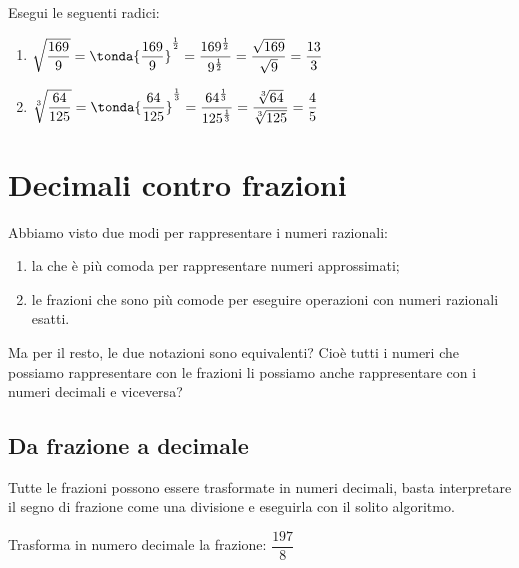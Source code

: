 \begin{esempio}{}{}
Esegui le seguenti radici:
\begin{enumerate} %
\item 
\(\sqrt{\dfrac{169}{9}} = \tonda{\dfrac{169}{9}}^{\frac{1}{2}} =
  \dfrac{169^{\frac{1}{2}}}{9^{\frac{1}{2}}} = 
  \dfrac{\sqrt{169}}{\sqrt{9}} = 
  \dfrac{13}{3}\)
\item 
\(\sqrt[3]{\dfrac{64}{125}} = \tonda{\dfrac{64}{125}}^{\frac{1}{3}} =
  \dfrac{64^{\frac{1}{3}}}{125^{\frac{1}{3}}} = 
  \dfrac{\sqrt[3]{64}}{\sqrt[3]{125}} = \dfrac{4}{5}\)
\end{enumerate}
\end{esempio}

\section{Decimali contro frazioni}
\label{sec:razionali_decimali_frazioni}

Abbiamo visto due modi per rappresentare i numeri razionali:
\begin{enumerate}
 \item la  che è più comoda per 
rappresentare numeri approssimati;
 \item le frazioni che sono più comode per eseguire operazioni con 
numeri razionali esatti.
\end{enumerate}

Ma per il resto, le due notazioni sono equivalenti? Cioè tutti i numeri che 
possiamo rappresentare con le frazioni li possiamo anche rappresentare con 
i numeri decimali e viceversa?

\subsection{Da frazione a decimale}

Tutte le frazioni possono essere trasformate in numeri decimali, basta 
interpretare il segno di frazione come una divisione e eseguirla con il 
solito algoritmo.

\begin{esempio}{}{}
Trasforma in numero decimale la frazione: \(\dfrac{197}{8}\)
{\frazdeca}
\end{esempio}


